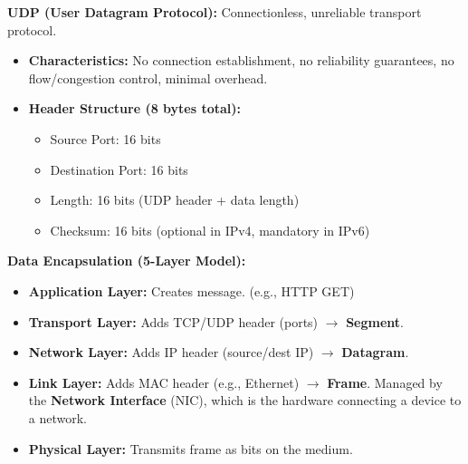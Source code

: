 \begin{minipage}[htp]{0.5\textwidth}
    \noindent\textbf{UDP (User Datagram Protocol):} Connectionless, unreliable transport protocol.
    \begin{itemize}[noitemsep,nolistsep,topsep=0px,partopsep=0pt,parsep=0pt]
        \item[-] \textbf{Characteristics:} No connection establishment, no reliability guarantees, no flow/congestion control, minimal overhead.
        \item[-] \textbf{Header Structure (8 bytes total):}
        \begin{itemize}[noitemsep,nolistsep,topsep=-5px,partopsep=0pt,parsep=0pt]
            \item Source Port: 16 bits
            \item Destination Port: 16 bits  
            \item Length: 16 bits (UDP header + data length)
            \item Checksum: 16 bits (optional in IPv4, mandatory in IPv6)
        \end{itemize}
    \end{itemize}

    \noindent\textbf{Data Encapsulation (5-Layer Model):}
    \begin{itemize}[noitemsep,nolistsep,topsep=0px,partopsep=0pt,parsep=0pt]
        \item[-] \textbf{Application Layer:} Creates message. (e.g., HTTP GET)
        \item[-] \textbf{Transport Layer:} Adds TCP/UDP header (ports) $\rightarrow$ \textbf{Segment}.
        \item[-] \textbf{Network Layer:} Adds IP header (source/dest IP) $\rightarrow$ \textbf{Datagram}.
        \item[-] \textbf{Link Layer:} Adds MAC header (e.g., Ethernet) $\rightarrow$ \textbf{Frame}. Managed by the \textbf{Network Interface} (NIC), which is the hardware connecting a device to a network.
        \item[-] \textbf{Physical Layer:} Transmits frame as bits on the medium.
    \end{itemize}


\end{minipage}
